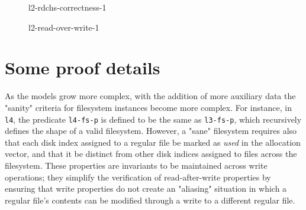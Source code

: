 \documentclass[runningheads,a4paper]{llncs}
\begin{document}
\begin{figure}
  \centering
  \caption{l2-rdchs-correctness-1}
  \label{l2-rdchs-correctness-1}
\end{figure}

\begin{figure}
  \centering
  \caption{l2-read-over-write-1}
  \label{l2-read-over-write-1}
\end{figure}

\section{Some proof details}

As the models grow more complex, with the addition of more auxiliary
data the "sanity" criteria for filesystem instances become more
complex. For instance, in \texttt{l4}, the predicate \texttt{l4-fs-p}
is defined to be the same as \texttt{l3-fs-p}, which recursively
defines the shape of a valid filesystem. However, a "sane" filesystem
requires also that each disk index assigned to a regular file be
marked as \textit{used} in the allocation vector, and that it be
distinct from other disk indices assigned to files across the
filesystem. These properties are invariants to be maintained across
write operations; they simplify the verification of read-after-write
properties by ensuring that write properties do not create an
"aliasing" situation in which a regular file's contents can be
modified through a write to a different regular file.
\end{document}
